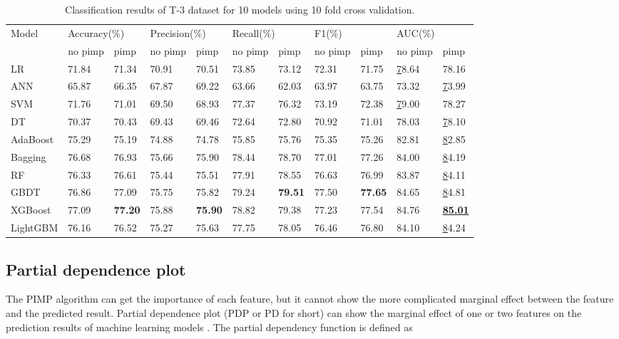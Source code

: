 \documentclass[review]{elsarticle}
\begin{document}
\begin{table}[H]\footnotesize
    \centering
    \caption{Classification results of T-3 dataset for 10 models using 10 fold cross validation.}
    \label{Classification results 3}
    \begin{tabular}{lllllllllll}
    \hline
    \multirow{2}{*}{Model} & \multicolumn{2}{l}{Accuracy(\%)} & \multicolumn{2}{l}{Precision(\%)} & \multicolumn{2}{l}{Recall(\%)} & \multicolumn{2}{l}{F1(\%)} & \multicolumn{2}{l}{AUC(\%)} \\ \cline{2-11}
     & no pimp & pimp & no pimp & pimp & no pimp & pimp & no pimp & pimp & no pimp & pimp \\ \hline
    LR & 71.84 & 71.34 & 70.91 & 70.51 & 73.85 & 73.12 & 72.31 & 71.75 & {\ul 78.64} & 78.16 \\
    ANN & 65.87 & 66.35 & 67.87 & 69.22 & 63.66 & 62.03 & 63.97 & 63.75 & 73.32 & {\ul 73.99} \\
    SVM & 71.76 & 71.01 & 69.50 & 68.93 & 77.37 & 76.32 & 73.19 & 72.38 & {\ul 79.00} & 78.27 \\
    DT & 70.37 & 70.43 & 69.43 & 69.46 & 72.64 & 72.80 & 70.92 & 71.01 & 78.03 & {\ul 78.10} \\
    AdaBoost & 75.29 & 75.19 & 74.88 & 74.78 & 75.85 & 75.76 & 75.35 & 75.26 & 82.81 & {\ul 82.85} \\
    Bagging & 76.68 & 76.93 & 75.66 & 75.90 & 78.44 & 78.70 & 77.01 & 77.26 & 84.00 & {\ul 84.19} \\
    RF & 76.33 & 76.61 & 75.44 & 75.51 & 77.91 & 78.55 & 76.63 & 76.99 & 83.87 & {\ul 84.11} \\
    GBDT & 76.86 & 77.09 & 75.75 & 75.82 & 79.24 & \textbf{79.51} & 77.50 & \textbf{77.65} & 84.65 & {\ul 84.81} \\
    XGBoost & 77.09 & \textbf{77.20} & 75.88 & \textbf{75.90} & 78.82 & 79.38 & 77.23 & 77.54 & 84.76 & {\ul \textbf{85.01}} \\
    LightGBM & 76.16 & 76.52 & 75.27 & 75.63 & 77.75 & 78.05 & 76.46 & 76.80 & 84.10 & {\ul 84.24} \\ \hline
    \end{tabular}
\end{table}

\subsection{Partial dependence plot}
The PIMP algorithm can get the importance of each feature, but it cannot show the more complicated marginal effect between the feature and the predicted result. Partial dependence plot (PDP or PD for short) can show the marginal effect of one or two features on the prediction results of machine learning models \citep{Hastie2009}. The partial dependency function is defined as
\end{document}
